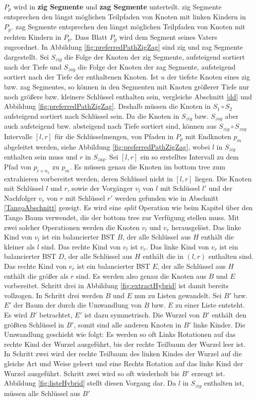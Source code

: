 \documentclass[a4paper,12pt]{article}
\begin{document}
$P_p$ wird in \textbf{zig Segmente} und \textbf{zag Segmente} unterteilt.  zig Segmente entsprechen den längst möglichen Teilpfaden von Knoten mit linken Kindern in $P_p$. zag Segmente entsprechen den längst möglichen Teilpfaden von Knoten mit rechten Kindern in $P_p$. Dass Blatt $P_p$ wird dem Segment seines Vaters zugeordnet. In Abbildung  \ref{fig:preferredPathZigZag} sind zig und zag Segmente dargestellt.  Sei $S_{zig}$ die Folge der Knoten der zig Segmente, aufsteigend sortiert nach der Tiefe und $S_{zag}$ die Folge der Knoten der zag Segmente, aufsteigend sortiert nach der Tiefe der enthaltenen Knoten. Ist $u$ der tiefste Knoten eines zig bzw. zag Segmentes, so können in den Segmenten mit Knoten größerer Tiefe nur noch größere bzw. kleinere Schlüssel enthalten sein, vergleiche Abschnitt \ref{dd} und Abbildung \ref{fig:preferredPathZigZag}. Deshalb müssen die Knoten in $S_1 \circ S_2$ aufsteigend sortiert nach Schlüssel sein. Da die Knoten in $S_{zig}$ bzw. $S_{zag}$ aber auch aufsteigend bzw. absteigend nach Tiefe sortiert sind, können aus $S_{zig} \circ S_{zag}$ Intervalle $\left[l, r\right]$ für die Schlüsselmengen, von Pfaden in $P_p$ mit Endknoten $p_m$ abgeleitet werden, siehe Abbildung \ref{fig:preferredPathZigZag}, wobei $l$ in $S_{zig}$ enthalten sein muss und $r$ in $S_{zag}$.  Sei $\left[l,r\right]$ ein so erstelltes Intervall zu dem Pfad von $p_{i + {n_1}}$ zu $p_m$. Es müssen genau die Knoten im bottom tree zum extrahieren vorbereitet werden, deren Schlüssel nicht in $\left[l, r\right]$ liegen. Die Knoten mit Schlüssel $l$ und $r$, sowie der Vorgänger $v_l$ von $l$ mit Schlüssel $l'$ und der Nachfolger $v_r$ von $r$ mit Schlüssel $r'$ werden gefunden wie in Abschnitt \ref{TangoAbschnitt} gezeigt.  Es wird eine \textit{split} Operation wie beim Kapitel über den Tango Baum verwendet, die der bottom tree zur Verfügung stellen muss. Mit zwei solcher Operationen werden die Knoten $v_l$ und $v_r$ herausgelöst. Das linke Kind von $v_l$ ist ein balancierter BST $B$, der alle Schlüssel aus $H$ enthält die kleiner als $l$ sind. Das rechte Kind von $v_l$ ist $v_r$. Das linke Kind von $v_r$ ist ein balancierter BST $D$, der alle Schlüssel aus $H$ enthält die in $\left(l, r\right)$ enthalten sind.  Das rechte  Kind von $v_r$ ist ein balancierter BST $E$, der alle Schlüssel aus $H$ enthält die größer als $r$ sind. Es werden also genau die Knoten aus $B$ und $E$ vorbereitet. Schritt drei in Abbildung \ref{fig:extractHybrid} ist damit bereits vollzogen. In Schritt drei werden $B$ und $E$ nun zu Listen gewandelt. Sei $B'$ bzw. $E'$ der Baum der durch die Umwandlung von $B$ bzw. $E$ zu einer Liste entsteht. Es wird $B'$ betrachtet, $E'$ ist dazu symmetrisch.  Die Wurzel von $B'$ enthält den größten Schlüssel in $B'$, somit sind alle anderen Knoten in $B'$ linke Kinder. Die Umwandlung geschieht wie folgt: Es werden so oft Links Rotationen auf das rechte Kind der Wurzel ausgeführt, bis der rechte Teilbaum der Wurzel leer ist. In Schritt zwei wird der rechte Teilbaum des linken Kindes der Wurzel auf die gleiche Art und Weise geleert und eine Rechts Rotation auf das linke Kind der Wurzel ausgeführt. Schritt zwei wird so oft wiederholt bis $B'$ erzeugt ist. Abbildung \ref{fig:listeHybrid} stellt diesen Vorgang dar. Da $l$ in $S_{zig}$ enthalten ist, müssen alle Schlüssel aus $B'$ 
\end{document}
